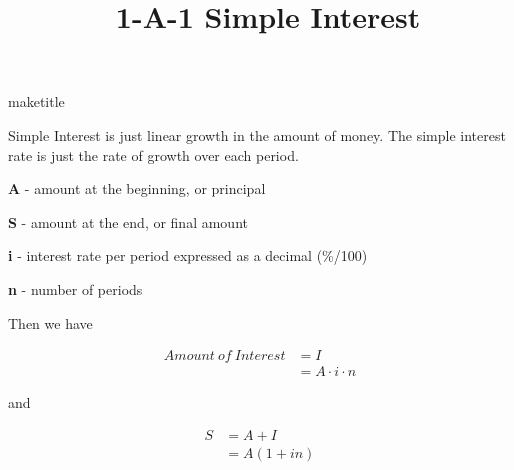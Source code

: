 \documentclass[12pt]{article}
\title{\normalfont\ 1-A-1 Simple Interest} %
\author{} %
\date{}  %
\begin{document}
maketitle %

\begin{flushleft}
    Simple Interest is just linear growth in the amount of money.  The simple interest rate is just the rate of growth over each period.
\end{flushleft}

\begin{description}
    \item\textbf{A} - amount at the beginning, or principal
    \item\textbf{S} - amount at the end, or final amount
    \item\textbf{i} - interest rate per period expressed as a decimal {(\%/100)}
    \item\textbf{n} - number of periods
\end{description}


\begin{flushleft}
    Then we have
\end{flushleft}

\begin{align*}
    Amount \: of \: Interest & = I                 \\
                             & = A \cdot i \cdot n
\end{align*}

\begin{flushleft}
    and
\end{flushleft}

\begin{align*}
    S & = A + I     \\
      & = A(1 + in)
\end{align*}

\end{document}
